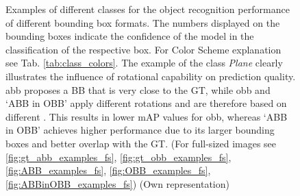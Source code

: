 \begin{figure}[h!]
\begin{tabularx}{\textwidth}{c|*{9}{X}}
\end{tabularx}
\caption[ABB and OBB: Examples of different classes for the object recognition performance]{Examples of different classes for the object recognition performance of different bounding box formats. The numbers displayed on the bounding boxes indicate the confidence of the model in the classification of the respective box. For Color Scheme explanation see Tab. \ref{tab:class_colors}. The example of the class \textit{Plane} clearly illustrates the influence of rotational capability on prediction quality. \acrshort{abb} proposes a \acrshort{BB} that is very close to the \acrshort{GT}, while \acrshort{obb} and ‘ABB in OBB’ apply different rotations and are therefore based on different . This results in lower \acrshort{mAP} values for \acrshort{obb}, whereas ‘ABB in OBB’ achieves higher performance due to its larger bounding boxes and better overlap with the \acrshort{GT}. (For full-sized images see \ref{fig:gt_abb_examples_fs}, \ref{fig:gt_obb_examples_fs}, \ref{fig:ABB_examples_fs}, \ref{fig:OBB_examples_fs}, \ref{fig:ABBinOBB_examples_fs})  (Own representation)}
\label{fig:aab_obb_example_pics}
\end{figure}